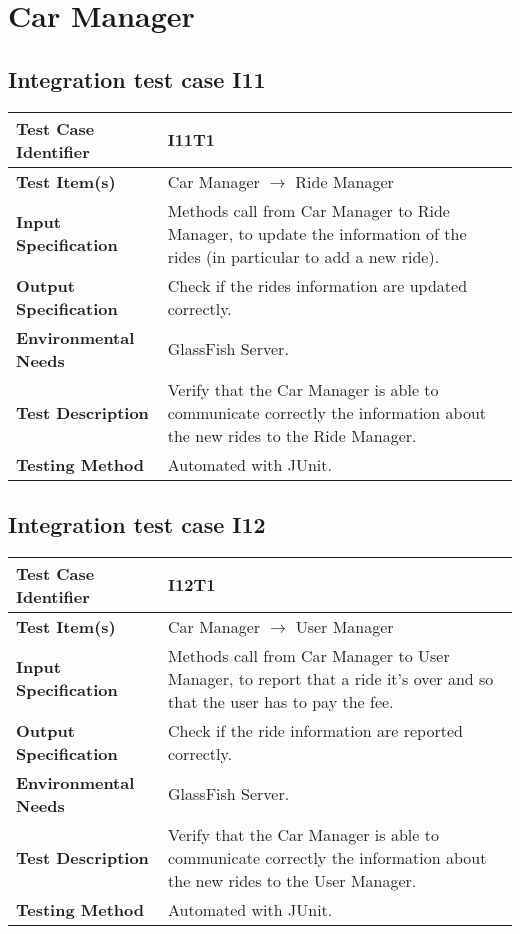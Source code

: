 \section{Car Manager}
\subsection{Integration test case I11}
\begin{tabular}{l p{}}
    \hline
    \textbf{Test Case Identifier} & I11T1\\
    \hline
    \textbf{Test Item(s)} & Car Manager $\rightarrow$ Ride Manager\\
    \hline
    \textbf{Input Specification} & Methods call from Car Manager to Ride Manager, to update the information of the rides (in particular to add a new ride).\\
    \hline
    \textbf{Output Specification} & Check if the rides information are updated correctly.\\
    \hline
    \textbf{Environmental Needs} & GlassFish Server.\\
    \hline
    \textbf{Test Description} & Verify that the Car Manager is able to communicate correctly the information about the new rides to the Ride Manager.\\
    \hline
    \textbf{Testing Method} & Automated with JUnit.\\
    \hline
\end{tabular}

\subsection{Integration test case I12}

\begin{tabular}{l p{}}
    \hline
    \textbf{Test Case Identifier} & I12T1\\
    \hline
    \textbf{Test Item(s)} & Car Manager $\rightarrow$ User Manager\\
    \hline
    \textbf{Input Specification} & Methods call from Car Manager to User Manager, to report that a ride it's over and so that the user has to pay the fee.\\
    \hline
    \textbf{Output Specification} & Check if the ride information are reported correctly.\\
    \hline
    \textbf{Environmental Needs} & GlassFish Server.\\
    \hline
    \textbf{Test Description} & Verify that the Car Manager is able to communicate correctly the information about the new rides to the User Manager.\\
    \hline
    \textbf{Testing Method} & Automated with JUnit.\\
    \hline
\end{tabular}